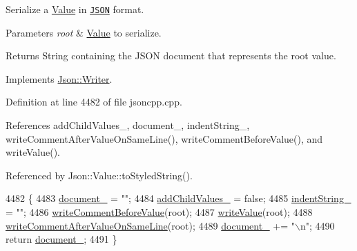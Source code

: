 Serialize a \hyperlink{class_json_1_1_value}{Value} in \href{http://www.json.org}{\tt J\+S\+ON} format. 


\begin{DoxyParams}{Parameters}
{\em root} & \hyperlink{class_json_1_1_value}{Value} to serialize. \\
\hline
\end{DoxyParams}
\begin{DoxyReturn}{Returns}
String containing the J\+S\+ON document that represents the root value. 
\end{DoxyReturn}


Implements \hyperlink{class_json_1_1_writer_a61c55882b82c7651d0b9b683c6d3f371}{Json\+::\+Writer}.



Definition at line 4482 of file jsoncpp.\+cpp.



References add\+Child\+Values\+\_\+, document\+\_\+, indent\+String\+\_\+, write\+Comment\+After\+Value\+On\+Same\+Line(), write\+Comment\+Before\+Value(), and write\+Value().



Referenced by Json\+::\+Value\+::to\+Styled\+String().


\begin{DoxyCode}
4482                                                     \{
4483   \hyperlink{class_json_1_1_styled_writer_ae967b0c77e4d7cb889ce7b6ee4ce28d7}{document\_} = \textcolor{stringliteral}{""};
4484   \hyperlink{class_json_1_1_styled_writer_acaabfa48b50a8bb7fa9ce98e2ae971d9}{addChildValues\_} = \textcolor{keyword}{false};
4485   \hyperlink{class_json_1_1_styled_writer_a7d91709c94c152bd44eaf80faac130ae}{indentString\_} = \textcolor{stringliteral}{""};
4486   \hyperlink{class_json_1_1_styled_writer_ad3452c48fabf968bf3693549331ec06e}{writeCommentBeforeValue}(root);
4487   \hyperlink{class_json_1_1_styled_writer_ac40143cf43f7c4a94d3d0b41e5245069}{writeValue}(root);
4488   \hyperlink{class_json_1_1_styled_writer_ab12b274c62822fc51ec4617c6be95139}{writeCommentAfterValueOnSameLine}(root);
4489   \hyperlink{class_json_1_1_styled_writer_ae967b0c77e4d7cb889ce7b6ee4ce28d7}{document\_} += \textcolor{stringliteral}{"\(\backslash\)n"};
4490   \textcolor{keywordflow}{return} \hyperlink{class_json_1_1_styled_writer_ae967b0c77e4d7cb889ce7b6ee4ce28d7}{document\_};
4491 \}
\end{DoxyCode}
\mbox{\label{class_json_1_1_styled_writer_a0618c23d62965515def15ece1e677f5d}} 
